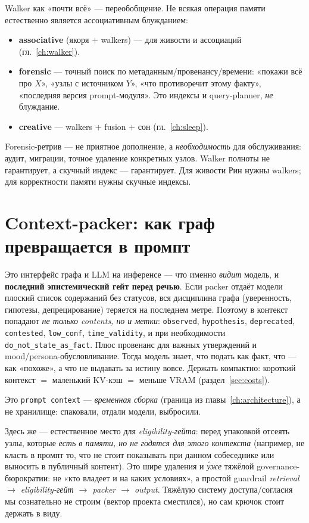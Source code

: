Walker как «почти всё» — переобобщение. Не всякая операция памяти естественно
является ассоциативным блужданием:
\begin{itemize}\itemsep1pt
\item \textbf{associative} (якоря $+$ walkers) — для живости и ассоциаций (гл.~\ref{ch:walker}).
\item \textbf{forensic} — точный поиск по метаданным/провенансу/времени: «покажи всё
про $X$», «узлы с источником $Y$», «что противоречит этому факту», «последняя версия
prompt-модуля». Это индексы и query-planner, \emph{не} блуждание.
\item \textbf{creative} — walkers $+$ fusion $+$ сон (гл.~\ref{ch:sleep}).
\end{itemize}
Forensic-ретрив — не приятное дополнение, а \emph{необходимость} для обслуживания:
аудит, миграции, точное удаление конкретных узлов. Walker полноты не гарантирует, а
скучный индекс — гарантирует. Для живости Рин нужны walkers; для корректности памяти
нужны скучные индексы.

\section{Context-packer: как граф превращается в промпт}
\label{sec:packer}

Это интерфейс графа и LLM на инференсе — что именно \emph{видит} модель, и
\textbf{последний эпистемический гейт перед речью}. Если packer отдаёт модели плоский
список содержаний без статусов, вся дисциплина графа (уверенность, гипотезы,
депрецирование) теряется на последнем метре. Поэтому в контекст попадают \emph{не
только contents, но и метки}: \texttt{observed}, \texttt{hypothesis},
\texttt{deprecated}, \texttt{contested}, \texttt{low\_conf}, \texttt{time\_validity},
и при необходимости \texttt{do\_not\_state\_as\_fact}. Плюс провенанс для важных
утверждений и mood/persona-обусловливание. Тогда модель знает, что подать как факт,
что — как «похоже», а что не выдавать за истину вовсе. Держать компактно: короткий
контекст $=$ маленький KV-кэш $=$ меньше VRAM (раздел~\ref{sec:costs}).

Это \texttt{prompt context} — \emph{временная сборка} (граница из
главы~\ref{ch:architecture}), а не хранилище: спаковали, отдали модели, выбросили.

Здесь же — естественное место для \emph{eligibility-гейта}: перед упаковкой отсеять
узлы, которые \emph{есть в памяти, но не годятся для этого контекста} (например, не
класть в промпт то, что не стоит показывать при данном собеседнике или выносить в
публичный контент). Это шире удаления и \emph{у́же} тяжёлой governance-бюрократии:
не «кто владеет и на каких условиях», а простой guardrail
\emph{retrieval $\to$ eligibility-гейт $\to$ packer $\to$ output}. Тяжёлую систему
доступа/согласия мы сознательно не строим (вектор проекта сместился), но сам крючок
стоит держать в виду.

